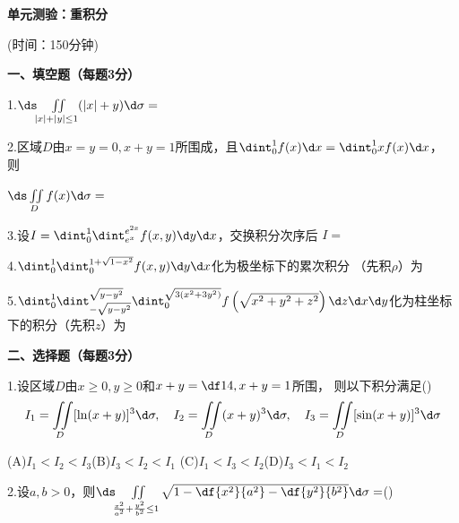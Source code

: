 \begin{center}
	{\Large\bf 单元测验：重积分}
	
	(时间：150分钟)
\end{center}

{\bf 一、填空题（每题3分）}

\bigskip

1.\;$\ds\iint\limits_{|x|+|y|\leq 1}(|x|+y)\d\sigma=$\underline{\hspace{4cm}}

2.\;区域$D$由$x=y=0,x+y=1$所围成，且$\dint_0^1f(x)\d x=\dint_0^1xf(x)\d x$，
则

$\ds\iint\limits_Df(x)\d\sigma=$\underline{\hspace{4cm}}

3.\;设$I=\dint_0^1\dint_{e^x}^{e^{2x}}f(x,y)\d y\d x$，交换积分次序后
$I=$\underline{\hspace{6cm}}

\bigskip

4.\;$\dint_0^1\dint_0^{1+\sqrt{1-x^2}}f(x,y)\d y\d x$化为极坐标下的累次积分
（先积$\rho$）为\underline{\hspace{4cm}}

\bigskip

5.\;$\dint_0^1\dint_{-\sqrt{y-y^2}}^{\sqrt{y-y^2}}
\dint_0^{\sqrt{3(x^2+3y^2)}}f\left(
\sqrt{x^2+y^2+z^2}\right)\d z\d x\d y$化为柱坐标下的积分（先积$z$）为

\bigskip\bigskip

\underline{\hspace{8cm}}

\bigskip

{\bf 二、选择题（每题3分）}

\bigskip

1.\;设区域$D$由$x\geq 0,y\geq0$和$x+y=\df14,x+y=1$所围，
则以下积分满足(\underline{\hspace{1cm}})
$$I_1=\iint\limits_D[\ln(x+y)]^3\d\sigma,\quad
I_2=\iint\limits_D(x+y)^3\d\sigma,\quad
I_3=\iint\limits_D[\sin(x+y)]^3\d\sigma$$

  \quad(A)$I_1<I_2<I_3$\hspace{1cm}(B)$I_3<I_2<I_1$\hspace{1cm}
  (C)$I_1<I_3<I_2$\hspace{1cm}(D)$I_3<I_1<I_2$

\bigskip

2.\;设$a,b>0$，则$\ds\iint\limits_{\frac{x^2}{a^2}+\frac{y^2}{b^2}\leq1}
\sqrt{1-\df{x^2}{a^2}-\df{y^2}{b^2}}\d\sigma=$(\underline{\hspace{1cm}})
  
